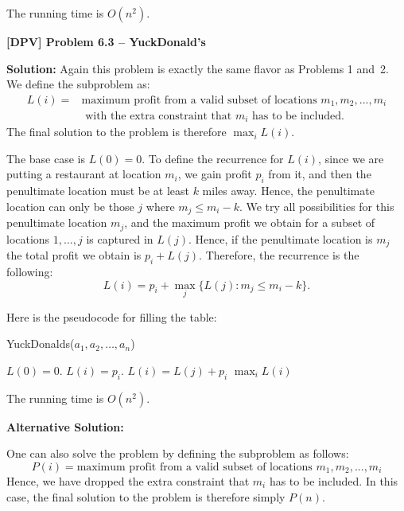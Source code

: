 \documentclass[12pt]{article}
\begin{document}
The running time is $O(n^2)$.


\newpage

{\noindent \bf [DPV] Problem 6.3 -- YuckDonald's}

{\noindent \bf Solution:}
Again this problem is exactly the same flavor as Problems 1 and~2.
We define the subproblem as:
\begin{eqnarray*}
  L(i) = & \mbox{maximum profit from a valid subset of locations $m_1,m_2,...,m_i$} \\
& \mbox{ with the extra
constraint that $m_i$ has to be included.}
\end{eqnarray*}
 The final solution to the problem is therefore
$\max_i L(i)$.

The base case is $L(0) = 0$. To define the recurrence for $L(i)$, 
since we are putting a restaurant at location $m_i$, we gain profit $p_i$ from it,
and then the penultimate location must be at least $k$ miles away.
Hence, the penultimate location can only be those $j$ where $m_j\leq m_i - k$.
We try all possibilities for this penultimate location $m_j$, and
the maximum profit we obtain for a subset of locations $1,\dots,j$ is
captured in $L(j)$.  Hence, if the penultimate location is $m_j$ the total
profit we obtain is $p_i+L(j)$.  Therefore, the recurrence is the following:
\[
L(i) = p_i + \max_{j}  \{L(j) : m_j \le m_i - k \}.
\]

Here is the pseudocode for filling the table:
\begin{algorithm}[h!]
\caption{YuckDonalds($a_1,a_2,\dots,a_n$)}
\begin{algorithmic}
\STATE $L(0) = 0$.
\STATE $L(i) = p_i$.
\STATE $L(i)=L(j) + p_i$
\ENDIF
\ENDIF
\ENDFOR
\ENDFOR
\RETURN $\max_i L(i)$
\end{algorithmic}
\end{algorithm}

The running time is $O(n^2)$.

\medskip

{\bf Alternative Solution:}

One can also solve the problem by defining the subproblem as follows:
\[
  P(i) =  \mbox{maximum profit from a valid subset of locations }  m_1,m_2,...,m_i
  \]
Hence, we have dropped the extra constraint that $m_i$ has to be included.
 In this case, the final solution to the problem is therefore simply $P(n)$.
\end{document}
